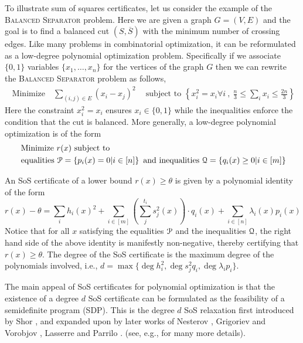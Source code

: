 \documentclass[a4paper,UKenglish]{lipics-v2016}
\begin{document}
To illustrate sum of squares certificates, let us consider the example of the
\textsc{Balanced Separator} problem.  Here we are given a graph $G = (V,E)$ and the goal is to find a balanced cut $(S,\overline{S})$ with the minimum number of crossing edges.
Like many problems in combinatorial optimization, it can be reformulated as a low-degree polynomial optimization problem.  
Specifically if we associate $\{0,1\}$ variables $\{x_1,\ldots,x_n\}$ for the vertices of the graph $G$ then we can rewrite the \textsc{Balanced Separator} problem as follows,
\begin{align*}
\text{ Minimize } \ \ \  \sum_{(i,j) \in E} (x_i-x_j)^2  \ \ \ \ \text{ subject to } \left\{ x_i^2 = x_i \forall i\ , \ \frac{n}{3} \leq \sum_i x_i \leq \frac{2n}{3} \right\}
\end{align*} 
Here the constraint $x_i^2 = x_i$ ensures $x_i \in \{0,1\}$ while the inequalities enforce the condition that the cut is balanced. More generally, a low-degree polynomial optimization is of the form
\begin{align*}
&\text{ Minimize } r(x) \text{ subject to } \\ &\text{ equalities } \mathcal P = \left\{ p_i(x) = 0 | i \in [n] \right\} \text{ and inequalities } \mathcal Q = \left\{ q_i(x) \geq 0 | i \in [m] \right\}
\end{align*} 

An SoS certificate of a lower bound $ r(x) \geq \theta$ is given by a polynomial identity of the form
\[ r(x) - \theta  = \sum_{i} h_i(x)^2 + \sum_{i \in [m]} \left(\sum_{j}^{t_i} s_j^2(x) \right) \cdot q_i(x) + \sum_{i \in [n]} \lambda_i(x) p_i(x) \]
Notice that for all $x$ satisfying the equalities $\mathcal P$ and the inequalities $\mathcal Q$, the right hand side of the above identity is manifestly non-negative, thereby certifying that $r(x) \geq \theta$.  The degree of the SoS certificate is the maximum degree of the polynomials involved, i.e., $d = \max\{\deg h_i^2, \deg s_j^2 q_i, \deg \lambda_i p_i\}$.

The main appeal of SoS certificates for polynomial optimization is that the existence of a degree $d$ SoS certificate can be formulated as the feasibility of a semidefinite program (SDP).
This is the degree $d$ SoS relaxation first introduced by Shor \cite{shor1987class}, and expanded upon by later works of Nesterov \cite{nesterov2000squared}, Grigoriev and Vorobjov \cite{grigoriev2001complexity}, Lasserre \cite{lasserre2000optimisation,lasserre2001global}  and Parrilo \cite{parrilo2000structured}.
(see, e.g., \cite{laurent2009sums,barak2014sum} for many more details).
\end{document}
